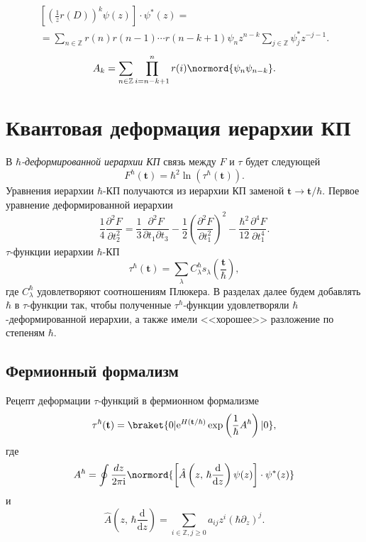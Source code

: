 \documentclass[a5paper,twoside]{article}
\begin{document}
\begin{multline*}
	\left[ \left( \frac{1}{z}r(D)  \right) ^k
	\psi(z)\right] \cdot \psi^*(z)=\\=
	\sum_{n \in \mathbb{Z}}^{} r(n)r(n-1)\cdots
	r\left( n-k+1 \right) \psi_n z^{n-k}\sum_{j \in \mathbb{Z}}^{} \psi_j^* z^{-j-1}
.\end{multline*}
\begin{equation}
	A_k=\sum_{n\in \mathbb{Z}}^{} \prod_{i=n-k+1}^{n} 
	r(i)\normord{\psi_n \psi_{n-k}}	\label{}
.\end{equation}
\section{Квантовая деформация иерархии КП}


В $\hbar $\emph{-деформированной иерархии КП} связь между $F$ и $\tau$ будет следующей
\begin{equation}
	F^\hbar \left( \mathbf{t} \right) =
	\hbar ^2 \ln \left( \tau^\hbar \left( \mathbf{t} \right)  \right) 
.\end{equation} 
Уравнения иерархии $\hbar$-КП получаются  из
иерархии КП заменой  $\mathbf{t}\to \mathbf{t} /\hbar $.
Первое уравнение деформированной иерархии
\begin{equation}
	\frac{1}{4} \frac{\partial ^2 F}{\partial t_2^2} =\frac{1}{3} \frac{\partial ^2 F}{\partial t_1 \partial t_3} -\frac{1}{2} \left( \frac{\partial^2 F}{\partial t_1^2} \right) ^2-\frac{\hbar ^2}{12} \frac{\partial^4 F}{
	\partial t_1^4}
.\end{equation} 
$\tau$-функции  иерархии $\hbar $-КП
\begin{equation}
	\tau^\hbar \left( \mathbf{t} \right) =
	\sum_{\lambda}^{} C_\lambda^\hbar 
	s_\lambda \left( \frac{\mathbf{t}}{\hbar } \right) 
	\label{eq:3}
,\end{equation} 
где $C^\hbar _{\lambda}$ удовлетворяют соотношениям Плюкера.
В разделах далее будем добавлять $\hbar $
в $\tau$-функции так, чтобы полученные $\tau^\hbar $-функции
удовлетворяли $\hbar$-деформированной иерархии, а также
имели  <<хорошее>> разложение по степеням $\hbar $.
\subsection{Фермионный формализм}
Рецепт деформации $\tau$-функций в фермионном формализме
\begin{equation}
	\tau^\hbar (\mathbf{t})= \braket{0 | \mathrm{e} ^{H\left( \mathbf{t} /\hbar  \right) } \exp \left( \frac{1}{\hbar }A^\hbar  \right) | 0}
,\end{equation} 
где
\begin{equation}
A^\hbar = \oint \frac{dz}{2\pi \mathrm{i} }
\normord{\left[ \hat{A}\left( z,\,\hbar \frac{\mathrm{d} }{\mathrm{d} z}\right)\psi(z)   \right] \cdot \psi^*(z)}
\end{equation} 
и
\begin{equation}
	\hat{A}\left( z,\,\hbar  \frac{\mathrm{d} }{\mathrm{d} z} \right) = \sum_{i \in \mathbb{Z},j\ge 0}^{} a_{ij}
	z^i \left( \hbar  \partial_z \right) ^j
.\end{equation} 
\end{document}
